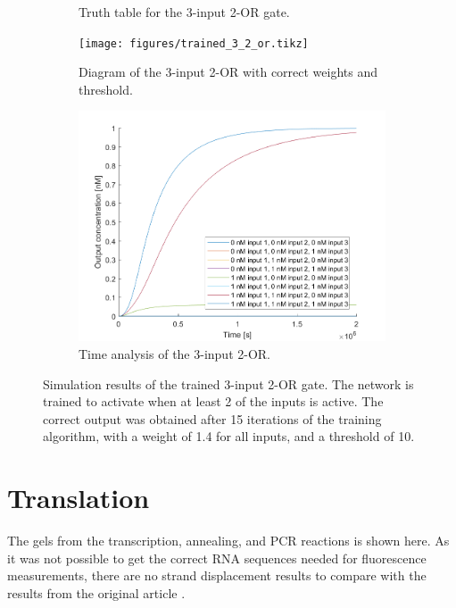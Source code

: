 \begin{figure}[H]
\begin{subfigure}[t]{.49\columnwidth}
\begin{adjustbox}{width=\textwidth}
\begin{tabular}[b]{cccc}
    \hline
    \end{tabular}
  \end{adjustbox}
    \caption{Truth table for the 3-input 2-OR gate.}
\end{subfigure}
\begin{subfigure}[t]{.49\textwidth}
  \texttt{[image: figures/trained\_3\_2\_or.tikz]}
  \caption{Diagram of the 3-input 2-OR with correct weights and threshold.}
\end{subfigure}
\hfill
\begin{subfigure}[t]{\textwidth}
  \centering
\includegraphics[width=\textwidth]{images/or_2_simulation_3input.png}
\caption{Time analysis of the 3-input 2-OR.}
\end{subfigure}
\caption{Simulation results of the trained 3-input 2-OR gate. The network is trained to activate when at least 2 of the inputs is active. The correct output was obtained after 15 iterations of the training algorithm, with a weight of 1.4 for all inputs, and a threshold of 10.}
\label{3_2_or}
\end{figure}

\section{Translation}
The gels from the transcription, annealing, and PCR reactions is shown here. As it was not possible to get the correct RNA sequences needed for fluorescence measurements, there are no strand displacement results to compare with the results from the original article \cite{Picuri2009}.

